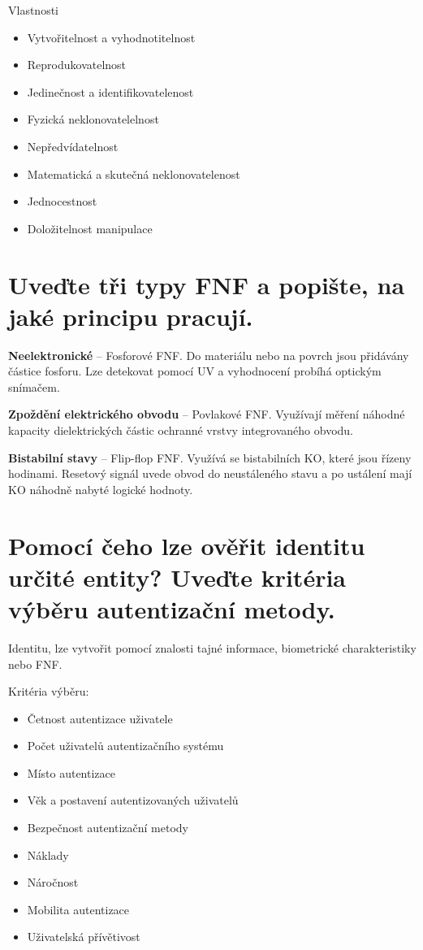Vlastnosti
\begin{itemize}
    \item Vytvořitelnost a vyhodnotitelnost
    \item Reprodukovatelnost
    \item Jedinečnost a identifikovatelenost
    \item Fyzická neklonovatelelnost
    \item Nepředvídatelnost
    \item Matematická a skutečná neklonovatelenost
    \item Jednocestnost
    \item Doložitelnost manipulace
\end{itemize}

\section{Uveďte tři typy FNF a popište, na jaké principu pracují.}
\textbf{Neelektronické} -- Fosforové FNF. Do materiálu nebo na povrch jsou přidávány částice fosforu. Lze detekovat pomocí UV a vyhodnocení probíhá optickým snímačem.

\textbf{Zpoždění elektrického obvodu} -- Povlakové FNF. Využívají měření náhodné kapacity dielektrických částic ochranné vrstvy integrovaného obvodu. 

\textbf{Bistabilní stavy} -- Flip-flop FNF. Využívá se bistabilních KO, které jsou řízeny hodinami. Resetový signál uvede obvod do neustáleného stavu a po ustálení mají KO náhodně nabyté logické hodnoty.

\section{Pomocí čeho lze ověřit identitu určité entity? Uveďte kritéria výběru autentizační metody.}

Identitu, lze vytvořit pomocí znalosti tajné informace, biometrické charakteristiky nebo FNF.

Kritéria výběru:
\begin{itemize}
    \item Četnost autentizace uživatele
    \item Počet uživatelů autentizačního systému
    \item Místo autentizace
    \item Věk a postavení autentizovaných uživatelů
    \item Bezpečnost autentizační metody
    \item Náklady
    \item Náročnost
    \item Mobilita autentizace
    \item Uživatelská přívětivost
\end{itemize}

